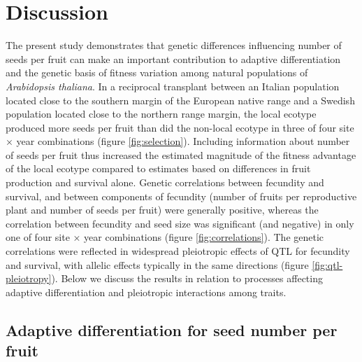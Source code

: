 \documentclass[]{article}
\begin{document}
\hypertarget{discussion}{%
\section{Discussion}\label{discussion}}

The present study demonstrates that genetic differences influencing number of seeds per fruit can make an important contribution to adaptive differentiation and the genetic basis of fitness variation among natural populations of \emph{Arabidopsis thaliana}. In a reciprocal transplant between an Italian population located close to the southern margin of the European native range and a Swedish population located close to the northern range margin, the local ecotype produced more seeds per fruit than did the non-local ecotype in three of four site × year combinations (figure \ref{fig:selection}). Including information about number of seeds per fruit thus increased the estimated magnitude of the fitness advantage of the local ecotype compared to estimates based on differences in fruit production and survival alone. Genetic correlations between fecundity and survival, and between components of fecundity (number of fruits per reproductive plant and number of seeds per fruit) were generally positive, whereas the correlation between fecundity and seed size was significant (and negative) in only one of four site × year combinations (figure \ref{fig:correlations}). The genetic correlations were reflected in widespread pleiotropic effects of QTL for fecundity and survival, with allelic effects typically in the same directions (figure \ref{fig:qtl-pleiotropy}). Below we discuss the results in relation to processes affecting adaptive differentiation and pleiotropic interactions among traits.

\hypertarget{adaptive-differentiation-for-seed-number-per-fruit}{%
\subsection{Adaptive differentiation for seed number per fruit}\label{adaptive-differentiation-for-seed-number-per-fruit}}
\end{document}
